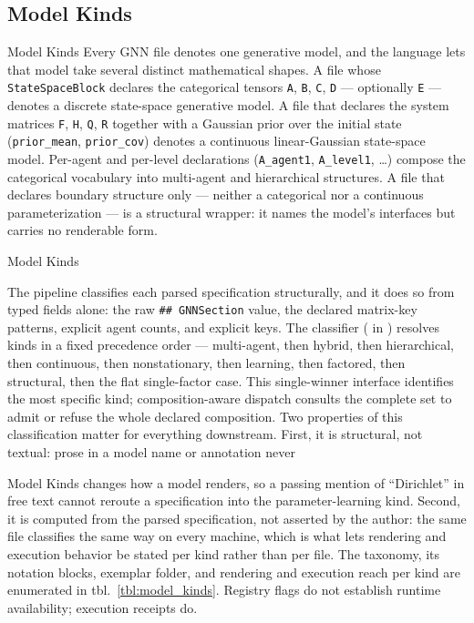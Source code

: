 \documentclass[
  ignorenonframetext,
]{beamer}
\begin{document}
\subsection{Model Kinds}\label{sec:model_kinds}

\begin{frame}{Model Kinds}
Every GNN file denotes one generative model, and the language lets that
model take several distinct mathematical shapes. A file whose
\texttt{StateSpaceBlock} declares the categorical tensors \texttt{A},
\texttt{B}, \texttt{C}, \texttt{D} --- optionally \texttt{E} --- denotes
a discrete state-space generative model. A file that declares the system
matrices \texttt{F}, \texttt{H}, \texttt{Q}, \texttt{R} together with a
Gaussian prior over the initial state (\texttt{prior\_mean},
\texttt{prior\_cov}) denotes a continuous linear-Gaussian state-space
model. Per-agent and per-level declarations (\texttt{A\_agent1},
\texttt{A\_level1}, \ldots) compose the categorical vocabulary into
multi-agent and hierarchical structures. A file that declares boundary
structure only --- neither a categorical nor a continuous
parameterization --- is a structural wrapper: it names the model's
interfaces but carries no renderable form.
\end{frame}

\begin{frame}{Model Kinds}

The pipeline classifies each parsed specification structurally, and it
does so from typed fields alone: the raw \texttt{\#\#\ GNNSection}
value, the declared matrix-key patterns, explicit agent counts, and
explicit  keys. The classifier
( in
) resolves kinds in a fixed
precedence order --- multi-agent, then hybrid, then hierarchical, then
continuous, then nonstationary, then learning, then factored, then
structural, then the flat single-factor case. This single-winner
interface identifies the most specific kind; composition-aware dispatch
consults the complete  set to admit or
refuse the whole declared composition. Two properties of this
classification matter for everything downstream. First, it is
structural, not textual: prose in a model name or annotation never
\end{frame}

\begin{frame}{Model Kinds}
changes how a model renders, so a passing mention of ``Dirichlet'' in
free text cannot reroute a specification into the parameter-learning
kind. Second, it is computed from the parsed specification, not asserted
by the author: the same file classifies the same way on every machine,
which is what lets rendering and execution behavior be stated per kind
rather than per file. The taxonomy, its notation blocks, exemplar
folder, and rendering and execution reach per kind are enumerated in
tbl.~\ref{tbl:model_kinds}. Registry flags do not establish runtime
availability; execution receipts do.

\end{frame}
\end{document}
